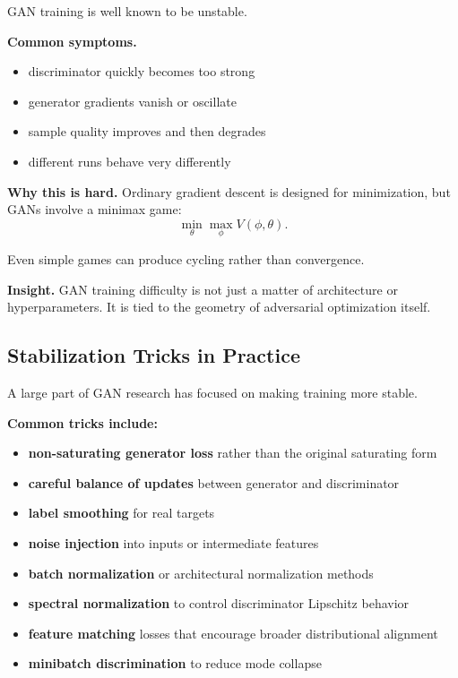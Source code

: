 GAN training is well known to be unstable.

\medskip

\noindent
\textbf{Common symptoms.}
\begin{itemize}
    \item discriminator quickly becomes too strong
    \item generator gradients vanish or oscillate
    \item sample quality improves and then degrades
    \item different runs behave very differently
\end{itemize}

\medskip

\noindent
\textbf{Why this is hard.}
Ordinary gradient descent is designed for minimization, but GANs involve a minimax game:
\[
\min_\theta \max_\phi V(\phi,\theta).
\]

Even simple games can produce cycling rather than convergence.

\medskip

\noindent
\textbf{Insight.}
GAN training difficulty is not just a matter of architecture or hyperparameters. It is tied to the geometry of adversarial optimization itself.

\subsection{Stabilization Tricks in Practice}

A large part of GAN research has focused on making training more stable.

\medskip

\noindent
\textbf{Common tricks include:}

\begin{itemize}
    \item \textbf{non-saturating generator loss} rather than the original saturating form
    \item \textbf{careful balance of updates} between generator and discriminator
    \item \textbf{label smoothing} for real targets
    \item \textbf{noise injection} into inputs or intermediate features
    \item \textbf{batch normalization} or architectural normalization methods
    \item \textbf{spectral normalization} to control discriminator Lipschitz behavior
    \item \textbf{feature matching} losses that encourage broader distributional alignment
    \item \textbf{minibatch discrimination} to reduce mode collapse
\end{itemize}

